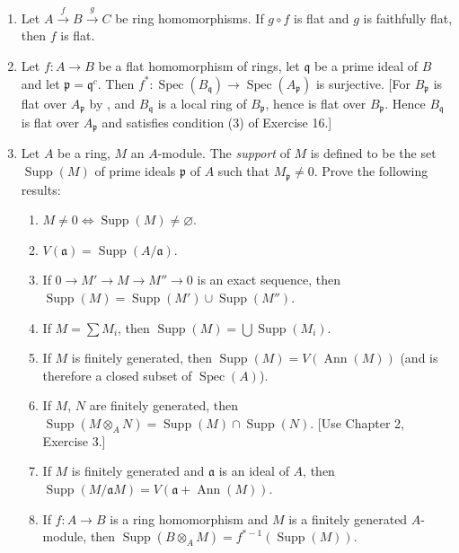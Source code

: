 \begin{enumerate}
iv) $\Rightarrow$ v): Let $M'$ be the kernel of $M\longrightarrow M_B$. Since $B$ is flat over $A$, the sequence $0\longrightarrow M_B'\longrightarrow M_B\longrightarrow(M_B)_B$ is exact. But (Chapter 2, Exercise 13, with $N=M_B$) the mapping $M_B\longrightarrow(M_B)_B$ is injective, hence $M_B'=0$ and therefore $M'=0$.

v) $\Rightarrow$ i): Take $M=A/\mathfrak a$.]

$B$ is said to be \textit{faithfully flat} over $A$.

\item Let $A\xrightarrow{f}B\xrightarrow{g}C$ be ring homomorphisms. If $g\circ f$ is flat and $g$ is faithfully flat, then $f$ is flat.

\item Let $f:A\longrightarrow B$ be a flat homomorphism of rings, let $\mathfrak q$ be a prime ideal of $B$ and let $\mathfrak p=\mathfrak q^c$. Then $f^*:\operatorname{Spec}(B_{\mathfrak q})\longrightarrow\operatorname{Spec}(A_{\mathfrak p})$ is surjective. [For $B_{\mathfrak p}$ is flat over $A_{\mathfrak p}$ by , and $B_{\mathfrak q}$ is a local ring of $B_{\mathfrak p}$, hence is flat over $B_{\mathfrak p}$. Hence $B_{\mathfrak q}$ is flat over $A_{\mathfrak p}$ and satisfies condition (3) of Exercise 16.]

\item Let $A$ be a ring, $M$ an $A$-module. The \textit{support} of $M$ is defined to be the set $\operatorname{Supp}(M)$ of prime ideals $\mathfrak p$ of $A$ such that $M_{\mathfrak p}\neq0$. Prove the following results:
\begin{enumerate}
\renewcommand{\labelenumii}{\roman{enumii})}
\item $M\neq0\Longleftrightarrow\operatorname{Supp}(M)\neq\varnothing$.
\item $V(\mathfrak a)=\operatorname{Supp}(A/\mathfrak a)$.
\item If $0\longrightarrow M'\longrightarrow M\longrightarrow M''\longrightarrow0$ is an exact sequence, then $\operatorname{Supp}(M)=\operatorname{Supp}(M')\cup\operatorname{Supp}(M'')$.
\item If $M=\sum M_i$, then $\operatorname{Supp}(M)=\bigcup\operatorname{Supp}(M_i)$.
\item If $M$ is finitely generated, then $\operatorname{Supp}(M)=V(\operatorname{Ann}(M))$ (and is therefore a closed subset of $\operatorname{Spec}(A)$).
\item If $M$, $N$ are finitely generated, then $\operatorname{Supp}(M\otimes_A N)=\operatorname{Supp}(M)\cap\operatorname{Supp}(N)$. [Use Chapter 2, Exercise 3.]
\item If $M$ is finitely generated and $\mathfrak a$ is an ideal of $A$, then $\operatorname{Supp}(M/\mathfrak aM)=V(\mathfrak a+\operatorname{Ann}(M))$.
\item If $f:A\longrightarrow B$ is a ring homomorphism and $M$ is a finitely generated $A$-module, then $\operatorname{Supp}(B\otimes_A M)=f^{*-1}(\operatorname{Supp}(M))$.
\end{enumerate}


\end{enumerate}
